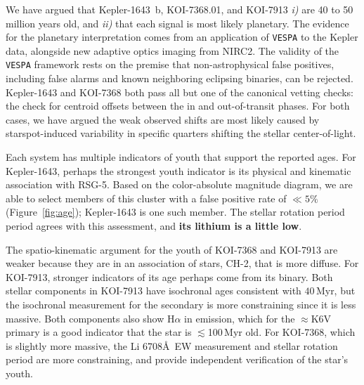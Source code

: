 \documentclass[12pt,twocolumn,linenumbers]{aastex63}
\begin{document}
We have argued that Kepler-1643~b, KOI-7368.01, and KOI-7913 {\it i)}
are 40 to 50 million years old, and {\it ii)} that each signal
is most likely planetary.  The evidence for the planetary
interpretation comes from an application of \texttt{VESPA} to the
Kepler data, alongside new adaptive optics imaging from NIRC2.  The
validity of the \texttt{VESPA} framework rests on the premise that
non-astrophysical false positives, including false alarms and known
neighboring eclipsing binaries, can be rejected.  Kepler-1643 and
KOI-7368 both pass all but one of the canonical vetting checks: the
check for centroid offsets between the in and out-of-transit phases.
For both cases, we have argued the weak observed shifts are most
likely caused by starspot-induced variability in specific quarters
shifting the stellar center-of-light.

Each system has multiple indicators of youth that support the
reported ages.  For Kepler-1643, perhaps the strongest youth indicator
is its physical and kinematic association with RSG-5.  Based on the
color-absolute magnitude diagram, we are able to select members
of this cluster with a false positive rate of $\ll 5\%$
(Figure~\ref{fig:age}); Kepler-1643 is one such member.  The stellar
rotation period period agrees with this assessment, and {\bf its
lithium is a little low}.

The spatio-kinematic argument for the youth of KOI-7368 and
KOI-7913 are weaker because they are in an association of stars, CH-2,
that is more diffuse.  For KOI-7913, stronger indicators of its age
perhaps come from its binary.  Both stellar components in KOI-7913
have isochronal ages consistent with $40$\,Myr, but the isochronal
measurement for the secondary is more constraining since it is less
massive.  Both components also show H$\alpha$ in emission, which for
the $\approx$K6V primary is a good indicator that the star is
$\lesssim$100$\,$Myr old.  For KOI-7368, which is slightly more
massive, the Li 6708\AA\ EW measurement and stellar rotation period
are more constraining, and provide independent verification of the
star's youth.





\end{document}
